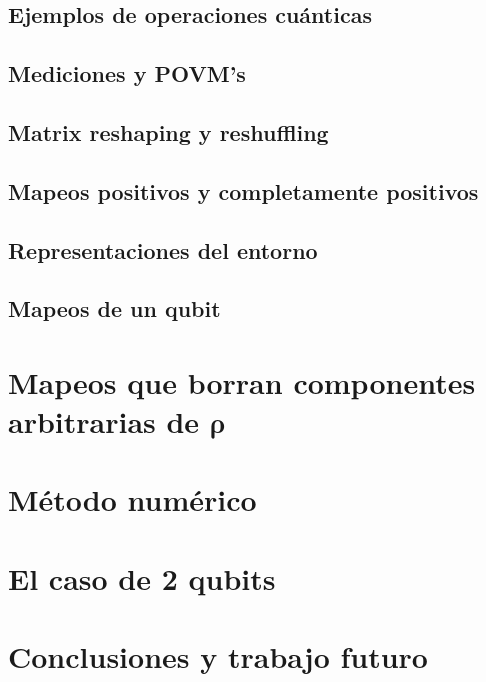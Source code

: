 \documentclass[11pt,dvipsnames]{report}
\begin{document}
\section{Ejemplos de operaciones cuánticas}

\section{Mediciones y POVM's}

\section{Matrix reshaping y reshuffling}

\section{Mapeos positivos y completamente positivos}

\section{Representaciones del entorno}

\section{Mapeos de un qubit}



\chapter{Mapeos que borran componentes arbitrarias de $\boldsymbol{\rho}$}



\chapter{Método numérico}



\chapter{El caso de 2 qubits}



\chapter{Conclusiones y trabajo futuro}





\end{document}

